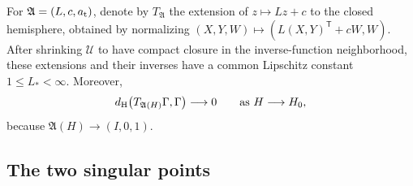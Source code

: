 For \(\mathfrak A=(L,c,a_{\rm t})\), denote by
\(T_{\mathfrak A}\) the extension of
\(z\mapsto Lz+c\) to the closed hemisphere, obtained by normalizing
\((X,Y,W)\mapsto(L(X,Y)^{\mathsf T}+cW,W)\).  After shrinking
\(\mathcal U\) to have compact closure in the inverse-function
neighborhood, these extensions and their inverses have a common Lipschitz
constant \(1\le L_*<\infty\).  Moreover,
\begin{equation}\label{eq:slice-graphic-motion}
 d_{\rm H}\bigl(T_{\mathfrak A(H)}\Gamma,\Gamma\bigr)\longrightarrow0
 \qquad\text{as }H\longrightarrow H_0,
\end{equation}
because \(\mathfrak A(H)\to(I,0,1)\).

\subsection{The two singular points}

